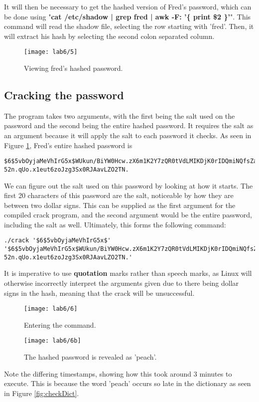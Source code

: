 It will then be necessary to get the hashed version of Fred's password, which can be done using
"\textbf{cat /etc/shadow | grep fred | awk -F: '\{ print \$2 \}'}".
This command will read the shadow file, selecting the row starting with 'fred'.
Then, it will extract his hash by selecting the second colon separated column.

\begin{figure}[H]
    \centering
    \texttt{[image: lab6/5]}
    \caption{Viewing fred's hashed password.}
    \label{fig:viewFredHash}
\end{figure}

\subsection{Cracking the password}\label{subsec:cracking-the-password}
The program takes two arguments, with the first being the salt used on the password and the
second being the entire hashed password.
It requires the salt as an argument because it will apply the salt to each password it checks.
As seen in Figure \ref{fig:viewFredHash}, Fred's entire hashed password is

\begin{verbatim}
$6$5vbOyjaMeVhIrG5x$WUkun/BiYW0Hcw.zX6m1K2Y7zQR0tVdLMIKDjK0rIDQmiNQfsZa
52n.qUo.x1eut6zoJzg3Sx0RJAavLZO2TN.
\end{verbatim}

We can figure out the salt used on this password by looking at how it starts.
The first 20 characters of this password are the salt, noticeable by how they are between two dollar signs.
This can be supplied as the first argument for the compiled crack program, and the second argument would be the
entire password, including the salt as well.
Ultimately, this forms the following command:

\begin{verbatim}
./crack '$6$5vbOyjaMeVhIrG5x$'
'$6$5vbOyjaMeVhIrG5x$WUkun/BiYW0Hcw.zX6m1K2Y7zQR0tVdLMIKDjK0rIDQmiNQfsZa
52n.qUo.x1eut6zoJzg3Sx0RJAavLZO2TN.'
\end{verbatim}

It is imperative to use \textbf{quotation} marks rather than speech marks, as Linux will otherwise incorrectly
interpret the arguments given due to there being dollar signs in the hash, meaning that the crack will be
unsuccessful.

\begin{figure}[H]
    \centering
    \texttt{[image: lab6/6]}
    \caption{Entering the command.}
    \label{fig:cracking}
\end{figure}

\begin{figure}[H]
    \centering
    \texttt{[image: lab6/6b]}
    \caption{The hashed password is revealed as 'peach'.}
    \label{fig:cracked}
\end{figure}

Note the differing timestamps, showing how this took around 3 minutes to execute.
This is because the word 'peach' occurs so late in the dictionary as seen in Figure \ref{fig:checkDict}.



